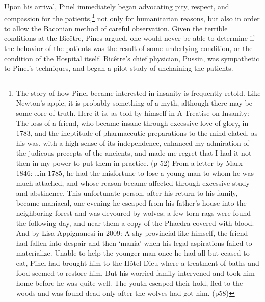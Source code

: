Upon his arrival, Pinel immediately began advocating pity, respect, and compassion for the patients,\footnote{The story of how Pinel became interested in insanity is frequently retold. Like Newton's apple, it is probably something of a myth, although there may be some core of truth. Here it is, as told by himself in A Treatise on Insanity:
 The loss of a friend, who became insane through excessive love of glory, in 1783, and the ineptitude of pharmaceutic preparations to the mind elated, as his was, with a high sense of its independence, enhanced my admiration of the judicous precepts of the ancients, and made me regret that I had it not then in my power to put them in practice. (p 52)
From a letter by Marx 1846:
 {\ldots}in 1785, he had the misfortune to lose a young man to whom he was much attached, and whose reason became affected through excessive study and abstinence. This unfortunate person, after his return to his family, became maniacal, one evening he escaped from his father's house into the neighboring forest and was devoured by wolves; a few torn rags were found the following day, and near them a copy of the Phaedra covered with blood.
And by Lisa Appignanesi in 2009:
A shy provincial like himself, the friend had fallen into despair and then `mania' when his legal aspirations failed to materialize. Unable to help the younger man once he had all but ceased to eat, Pinel had brought him to the Hôtel-Dieu where a treatment of baths and food seemed to restore him. But his worried family intervened and took him home before he was quite well. The youth escaped their hold, fled to the woods and was found dead only after the wolves had got him. (p58)} not only for humanitarian reasons, but also in order to allow the Baconian method of careful observation. Given the terrible conditions at the Bicêtre, Pines argued, one would never be able to determine if the behavior of the patients was the result of some underlying condition, or the condition of the Hospital itself. Bicêtre's chief physician, Pussin, was sympathetic to Pinel's techniques, and began a pilot study of unchaining the patients.

